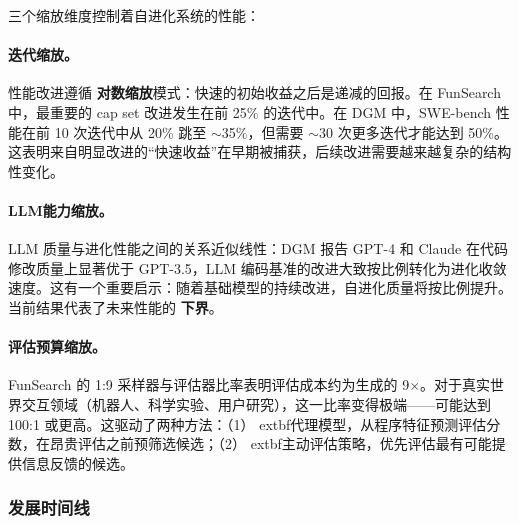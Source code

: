 三个缩放维度控制着自进化系统的性能：

\paragraph{迭代缩放。}
性能改进遵循 \textbf{对数缩放}模式：快速的初始收益之后是递减的回报。在 FunSearch 中，最重要的 cap set 改进发生在前 25\% 的迭代中。在 DGM 中，SWE-bench 性能在前 10 次迭代中从 20\% 跳至 $\sim$35\%，但需要 $\sim$30 次更多迭代才能达到 50\%。这表明来自明显改进的``快速收益''在早期被捕获，后续改进需要越来越复杂的结构性变化。

\paragraph{LLM能力缩放。}
LLM 质量与进化性能之间的关系近似线性：DGM 报告 GPT-4 和 Claude 在代码修改质量上显著优于 GPT-3.5，LLM 编码基准的改进大致按比例转化为进化收敛速度。这有一个重要启示：随着基础模型的持续改进，自进化质量将按比例提升。当前结果代表了未来性能的 \textbf{下界}。

\paragraph{评估预算缩放。}
FunSearch 的 1:9 采样器与评估器比率表明评估成本约为生成的 9$\times$。对于真实世界交互领域（机器人、科学实验、用户研究），这一比率变得极端——可能达到 100:1 或更高。这驱动了两种方法：（1）	extbf{代理模型}，从程序特征预测评估分数，在昂贵评估之前预筛选候选；（2）	extbf{主动评估}策略，优先评估最有可能提供信息反馈的候选。


\subsubsection{发展时间线}


